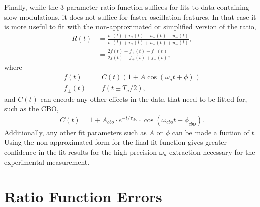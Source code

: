 Finally, while the 3 parameter ratio function suffices for fits to data containing slow modulations, it does not suffice for faster oscillation features. In that case it is more useful to fit with the non-approximated or simplified version of the ratio,
	\begin{equation}	
	\begin{aligned}
		R(t) &= \frac{v_{1}(t) + v_{2}(t) - u_{+}(t) - u_{-}(t)}{v_{1}(t) + v_{2}(t) + u_{+}(t) + u_{-}(t)}, \\ 
			 &= \frac{2f(t) - f_{+}(t) - f_{-}(t)}{2f(t) + f_{+}(t) + f_{-}(t)},
	\end{aligned}
	\end{equation}
where
	\begin{equation}	
	\begin{aligned}
		f(t) &= C(t) (1 + A \cos(\omega_{a}t + \phi)) \\ 
		f_{\pm}(t) &= f(t \pm T_{a}/2),
	\end{aligned}
	\end{equation}
and $C(t)$ can encode any other effects in the data that need to be fitted for, such as the CBO,
	\begin{align}
		C(t) = 1 + A_{cbo} \cdot e^{-t/\tau_{cbo}} \cdot \cos(\omega_{cbo}t + \phi_{cbo}).
	\end{align}
Additionally, any other fit parameters such as $A$ or $\phi$ can be made a fuction of $t$. Using the non-approximated form for the final fit function gives greater confidence in the fit results for the high precision $\omega_{a}$ extraction necessary for the experimental measurement.


\section{Ratio Function Errors}

